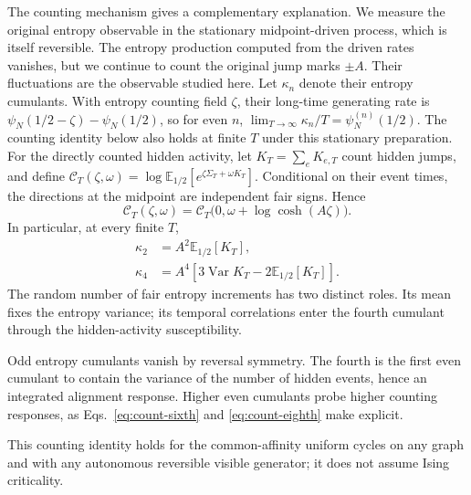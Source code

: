 \documentclass[aps,pre,reprint,amsmath,amssymb,longbibliography,floatfix]{revtex4-2}
\newcommand{\E}{\mathbb E}
\newcommand{\Var}{\operatorname{Var}}
\begin{document}
The counting mechanism gives a complementary explanation. We measure
the original entropy observable in the stationary midpoint-driven
process, which is itself reversible. The entropy production computed from the driven rates vanishes, but
we continue to count the original jump marks $\pm A$. Their fluctuations
are the observable studied here. Let $\kappa_n$ denote their entropy
cumulants. With entropy counting field $\zeta$, their long-time generating rate is
$\psi_N(1/2-\zeta)-\psi_N(1/2)$, so for even $n$,
$\lim_{T\to\infty}\kappa_n/T=\psi_N^{(n)}(1/2)$.
The counting identity below also holds at finite $T$ under this stationary
preparation. For the directly counted hidden activity, let
$K_T=\sum_e K_{e,T}$ count hidden jumps, and define
$\mathscr C_T(\zeta,\omega)=\log\E_{1/2}\left[e^{\zeta\Sigma_T+\omega K_T}\right]$. Conditional on their event times, the
directions at the midpoint are independent fair signs. Hence
\begin{equation}
 \mathscr C_T(\zeta,\omega)
 =\mathscr C_T\bigl(0,\omega+\log\cosh(A\zeta)\bigr).
 \label{eq:all-count-composition}
\end{equation}
In particular, at every finite $T$,
\begin{equation}
 \begin{aligned}
 \kappa_2&=A^2\E_{1/2}\left[K_T\right],\\
 \kappa_4&=A^4\left[3\Var K_T-2\E_{1/2}\left[K_T\right]\right].
 \end{aligned}
 \label{eq:entropy-activity-cumulants}
\end{equation}
The random number of fair entropy increments has two distinct roles.
Its mean fixes the entropy variance; its temporal correlations enter
the fourth cumulant through the hidden-activity susceptibility.

Odd entropy cumulants vanish by reversal symmetry. The fourth is the
first even cumulant to contain the variance of the number of hidden
events, hence an integrated alignment response. Higher even cumulants
probe higher counting responses, as Eqs.~\eqref{eq:count-sixth} and
\eqref{eq:count-eighth} make explicit.

 This counting identity holds for the common-affinity
uniform cycles on any graph and with any autonomous reversible visible generator;
it does not assume Ising criticality.
\end{document}
